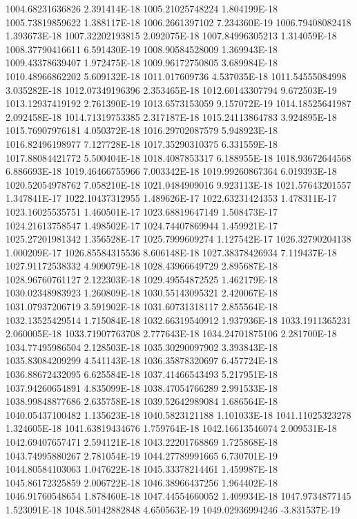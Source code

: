 1004.68231636826  2.391414E-18
1005.21025748224  1.804199E-18
1005.73819859622  1.388117E-18
1006.2661397102  7.234360E-19
1006.79408082418  1.393673E-18
1007.32202193815  2.092075E-18
1007.84996305213  1.314059E-18
1008.37790416611  6.591430E-19
1008.90584528009  1.369943E-18
1009.43378639407  1.972475E-18
1009.96172750805  3.689984E-18
1010.48966862202  5.609132E-18
1011.017609736  4.537035E-18
1011.54555084998  3.035282E-18
1012.07349196396  2.353465E-18
1012.60143307794  9.672503E-19
1013.12937419192  2.761390E-19
1013.6573153059  9.157072E-19
1014.18525641987  2.092458E-18
1014.71319753385  2.317187E-18
1015.24113864783  3.924895E-18
1015.76907976181  4.050372E-18
1016.29702087579  5.948923E-18
1016.82496198977  7.127728E-18
1017.35290310375  6.331559E-18
1017.88084421772  5.500404E-18
1018.4087853317  6.188955E-18
1018.93672644568  6.886693E-18
1019.46466755966  7.003342E-18
1019.99260867364  6.019393E-18
1020.52054978762  7.058210E-18
1021.0484909016  9.923113E-18
1021.57643201557  1.347841E-17
1022.10437312955  1.489626E-17
1022.63231424353  1.478311E-17
1023.16025535751  1.460501E-17
1023.68819647149  1.508473E-17
1024.21613758547  1.498502E-17
1024.74407869944  1.459921E-17
1025.27201981342  1.356528E-17
1025.7999609274  1.127542E-17
1026.32790204138  1.000209E-17
1026.85584315536  8.606148E-18
1027.38378426934  7.119437E-18
1027.91172538332  4.909079E-18
1028.43966649729  2.895687E-18
1028.96760761127  2.122303E-18
1029.49554872525  1.462179E-18
1030.02348983923  1.260809E-18
1030.55143095321  2.420067E-18
1031.07937206719  3.591902E-18
1031.60731318117  2.855564E-18
1032.13525429514  1.715084E-18
1032.66319540912  1.937936E-18
1033.1911365231  2.060005E-18
1033.71907763708  2.777643E-18
1034.24701875106  2.281700E-18
1034.77495986504  2.128503E-18
1035.30290097902  3.393843E-18
1035.83084209299  4.541143E-18
1036.35878320697  6.457724E-18
1036.88672432095  6.625584E-18
1037.41466543493  5.217951E-18
1037.94260654891  4.835099E-18
1038.47054766289  2.991533E-18
1038.99848877686  2.635758E-18
1039.52642989084  1.686564E-18
1040.05437100482  1.135623E-18
1040.5823121188  1.101033E-18
1041.11025323278  1.324605E-18
1041.63819434676  1.759764E-18
1042.16613546074  2.009531E-18
1042.69407657471  2.594121E-18
1043.22201768869  1.725868E-18
1043.74995880267  2.781054E-19
1044.27789991665  6.730701E-19
1044.80584103063  1.047622E-18
1045.33378214461  1.459987E-18
1045.86172325859  2.006722E-18
1046.38966437256  1.964402E-18
1046.91760548654  1.878460E-18
1047.44554660052  1.409934E-18
1047.9734877145  1.523091E-18
1048.50142882848  4.650563E-19
1049.02936994246  -3.831537E-19
